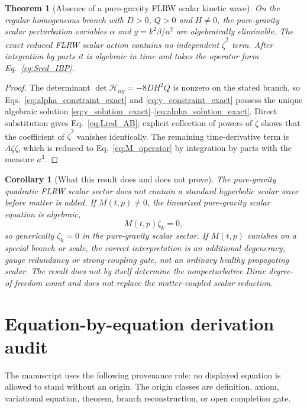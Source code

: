 \documentclass[11pt,a4paper]{article}
\newtheorem{theorem}[axiom]{Theorem}
\newtheorem{corollary}[axiom]{Corollary}
\begin{document}
\begin{theorem}[Absence of a pure-gravity FLRW scalar kinetic wave]
On the regular homogeneous branch with \(D>0\), \(Q>0\) and \(H\neq0\), the
pure-gravity scalar perturbation variables \(\alpha\) and \(y=k^2\beta/a^2\) are
algebraically eliminable. The exact reduced FLRW scalar action contains no
independent \(\dot\zeta^2\) term. After integration by parts it is algebraic in
time and takes the operator form Eq.~\eqref{eq:Sred_IBP}.
\end{theorem}

\begin{proof}
The determinant \(\det\mathcal H_{\alpha y}=-8DH^2Q\) is nonzero on the stated
branch, so Eqs.~\eqref{eq:alpha_constraint_exact} and
\eqref{eq:y_constraint_exact} possess the unique algebraic solution
\eqref{eq:y_solution_exact}--\eqref{eq:alpha_solution_exact}. Direct
substitution gives Eq.~\eqref{eq:Lred_AB}; explicit collection of powers of
\(\dot\zeta\) shows that the coefficient of \(\dot\zeta^2\) vanishes identically.
The remaining time-derivative term is \(A\zeta\dot\zeta\), which is reduced to
Eq.~\eqref{eq:M_operator} by integration by parts with the measure \(a^3\).
\end{proof}

\begin{corollary}[What this result does and does not prove]
The pure-gravity quadratic FLRW scalar sector does not contain a standard
hyperbolic scalar wave before matter is added. If \(M(t,p)\neq0\), the
linearized pure-gravity scalar equation is algebraic,
\[
M(t,p)\zeta_k=0,
\]
so generically \(\zeta_k=0\) in the pure-gravity scalar sector. If \(M(t,p)\)
vanishes on a special branch or scale, the correct interpretation is an
additional degeneracy, gauge redundancy or strong-coupling gate, not an
ordinary healthy propagating scalar. The result does not by itself determine
the nonperturbative Dirac degree-of-freedom count and does not replace the
matter-coupled scalar reduction.
\end{corollary}

\section{Equation-by-equation derivation audit}

The manuscript uses the following provenance rule: no displayed equation is allowed to stand without an origin. The origin classes are definition, axiom, variational equation, theorem, branch reconstruction, or open completion gate.
\end{document}
